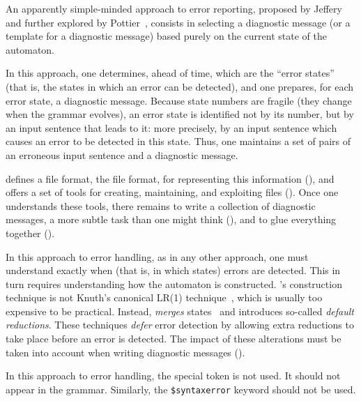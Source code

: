 \documentclass[onecolumn,11pt,nocopyrightspace,preprint]{sigplanconf}
\begin{document}
An apparently simple-minded approach to error reporting,
proposed by Jeffery~\cite{jeffery-03} and further explored by
Pottier~\cite{pottier-reachability-cc-2016}, consists in selecting a diagnostic
message (or a template for a diagnostic message) based purely on the current
state of the automaton.

In this approach, one determines, ahead of time, which are the ``error
states'' (that is, the states in which an error can be detected), and one
prepares, for each error state, a diagnostic message. Because state numbers
are fragile (they change when the grammar evolves), an error state is
identified not by its number, but by an input sentence that leads to it: more
precisely, by an input sentence which causes an error to be detected in this
state. Thus, one maintains a set of pairs of an erroneous input sentence and a
diagnostic message.

\menhir defines a file format, the \messages file format,
for representing this information (), and offers a
set of tools for creating, maintaining, and exploiting \messages files
(). Once one understands these tools, there remains
to write a collection of diagnostic messages, a more subtle task than one
might think (), and to glue everything together
().

In this approach to error handling, as in any other approach, one must
understand exactly when (that is, in which states) errors are detected.
This in turn requires understanding how the automaton is constructed.
\menhir's construction technique is not Knuth's canonical LR(1)
technique~\cite{knuth-lr-65}, which is usually too expensive to be practical.
Instead, \menhir \emph{merges} states~\cite{pager-77} and introduces so-called \emph{default
reductions}. These techniques \emph{defer} error detection by allowing
extra reductions to take place before an error is detected.
The impact of these alterations must be taken into account when writing
diagnostic messages ().

In this approach to error handling, the special \error token is not used. It
should not appear in the grammar. Similarly, the \verb+$syntaxerror+ keyword
should not be used.

\end{document}

